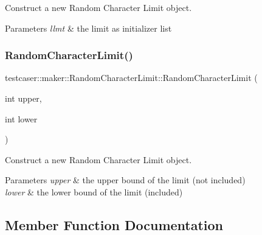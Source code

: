 Construct a new Random Character Limit object. 


\begin{DoxyParams}{Parameters}
{\em llmt} & the limit as initializer list \\
\hline
\end{DoxyParams}
\mbox{\label{classtestcaser_1_1maker_1_1RandomCharacterLimit_a7a85c6420ec09f97e648f516a9bb68fd}} 
\subsubsection{\texorpdfstring{RandomCharacterLimit()}{RandomCharacterLimit()}\hspace{0.1cm}{\footnotesize\ttfamily [2/2]}}
{\footnotesize\ttfamily testcaser\+::maker\+::\+Random\+Character\+Limit\+::\+Random\+Character\+Limit (\begin{DoxyParamCaption}\item[{int}]{upper,  }\item[{int}]{lower }\end{DoxyParamCaption})\hspace{0.3cm}{\ttfamily [inline]}}



Construct a new Random Character Limit object. 


\begin{DoxyParams}{Parameters}
{\em upper} & the upper bound of the limit (not included) \\
\hline
{\em lower} & the lower bound of the limit (included) \\
\hline
\end{DoxyParams}


\subsection{Member Function Documentation}
\mbox{\label{classtestcaser_1_1maker_1_1RandomCharacterLimit_a912c757f9c26f6ba3e3ec18db3c904c5}} 
